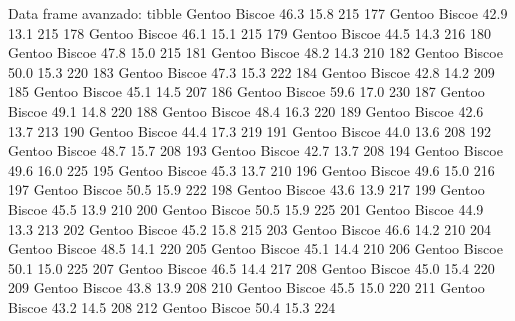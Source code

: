 \documentclass[
  ignorenonframetext,
  aspectratio=169]{beamer}
\let\oldverbatim\verbatim
\let\endoldverbatim\endverbatim
\renewenvironment{verbatim}{\tiny\oldverbatim}{\endoldverbatim}
\begin{document}
\begin{frame}[fragile]{Data frame avanzado: tibble}
\begin{verbatim}
176    Gentoo    Biscoe           46.3          15.8               215
177    Gentoo    Biscoe           42.9          13.1               215
178    Gentoo    Biscoe           46.1          15.1               215
179    Gentoo    Biscoe           44.5          14.3               216
180    Gentoo    Biscoe           47.8          15.0               215
181    Gentoo    Biscoe           48.2          14.3               210
182    Gentoo    Biscoe           50.0          15.3               220
183    Gentoo    Biscoe           47.3          15.3               222
184    Gentoo    Biscoe           42.8          14.2               209
185    Gentoo    Biscoe           45.1          14.5               207
186    Gentoo    Biscoe           59.6          17.0               230
187    Gentoo    Biscoe           49.1          14.8               220
188    Gentoo    Biscoe           48.4          16.3               220
189    Gentoo    Biscoe           42.6          13.7               213
190    Gentoo    Biscoe           44.4          17.3               219
191    Gentoo    Biscoe           44.0          13.6               208
192    Gentoo    Biscoe           48.7          15.7               208
193    Gentoo    Biscoe           42.7          13.7               208
194    Gentoo    Biscoe           49.6          16.0               225
195    Gentoo    Biscoe           45.3          13.7               210
196    Gentoo    Biscoe           49.6          15.0               216
197    Gentoo    Biscoe           50.5          15.9               222
198    Gentoo    Biscoe           43.6          13.9               217
199    Gentoo    Biscoe           45.5          13.9               210
200    Gentoo    Biscoe           50.5          15.9               225
201    Gentoo    Biscoe           44.9          13.3               213
202    Gentoo    Biscoe           45.2          15.8               215
203    Gentoo    Biscoe           46.6          14.2               210
204    Gentoo    Biscoe           48.5          14.1               220
205    Gentoo    Biscoe           45.1          14.4               210
206    Gentoo    Biscoe           50.1          15.0               225
207    Gentoo    Biscoe           46.5          14.4               217
208    Gentoo    Biscoe           45.0          15.4               220
209    Gentoo    Biscoe           43.8          13.9               208
210    Gentoo    Biscoe           45.5          15.0               220
211    Gentoo    Biscoe           43.2          14.5               208
212    Gentoo    Biscoe           50.4          15.3               224

\end{verbatim}
\end{frame}
\end{document}
